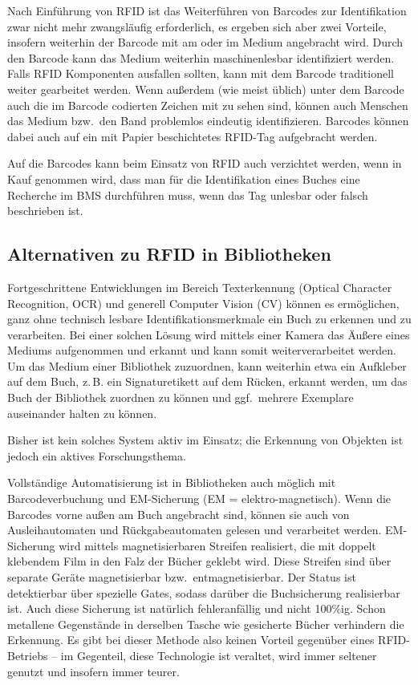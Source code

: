 \documentclass[
  11pt,
  letterpaper,
  DIV=11,
  twoside]{scrreprt}
\begin{document}
Nach Einführung von RFID ist das Weiterführen von Barcodes zur
Identifikation zwar nicht mehr zwangsläufig erforderlich, es ergeben
sich aber zwei Vorteile, insofern weiterhin der Barcode mit am oder im
Medium angebracht wird. Durch den Barcode kann das Medium weiterhin
maschinenlesbar identifiziert werden. Falls RFID Komponenten ausfallen
sollten, kann mit dem Barcode traditionell weiter gearbeitet werden.
Wenn außerdem (wie meist üblich) unter dem Barcode auch die im Barcode
codierten Zeichen mit zu sehen sind, können auch Menschen das Medium
bzw.~den Band problemlos eindeutig identifizieren. Barcodes können dabei
auch auf ein mit Papier beschichtetes RFID-Tag aufgebracht werden.

Auf die Barcodes kann beim Einsatz von RFID auch verzichtet werden, wenn
in Kauf genommen wird, dass man für die Identifikation eines Buches eine
Recherche im BMS durchführen muss, wenn das Tag unlesbar oder falsch
beschrieben ist.

\subsection{Alternativen zu RFID in
Bibliotheken}\label{alternativen-zu-rfid-in-bibliotheken}

Fortgeschrittene Entwicklungen im Bereich Texterkennung (Optical
Character Recognition, OCR) und generell Computer Vision (CV) können es
ermöglichen, ganz ohne technisch lesbare Identifikationsmerkmale ein
Buch zu erkennen und zu verarbeiten. Bei einer solchen Lösung wird
mittels einer Kamera das Äußere eines Mediums aufgenommen und erkannt
und kann somit weiterverarbeitet werden. Um das Medium einer Bibliothek
zuzuordnen, kann weiterhin etwa ein Aufkleber auf dem Buch, z.\,B. ein
Signaturetikett auf dem Rücken, erkannt werden, um das Buch der
Bibliothek zuordnen zu können und ggf.~mehrere Exemplare auseinander
halten zu können.

Bisher ist kein solches System aktiv im Einsatz; die Erkennung von
Objekten ist jedoch ein aktives Forschungsthema.

Vollständige Automatisierung ist in Bibliotheken auch möglich mit
Barcodeverbuchung und EM-Sicherung (EM = elektro-magnetisch). Wenn die
Barcodes vorne außen am Buch angebracht sind, können sie auch von
Ausleihautomaten und Rückgabeautomaten gelesen und verarbeitet werden.
EM-Sicherung wird mittels magnetisierbaren Streifen realisiert, die mit
doppelt klebendem Film in den Falz der Bücher geklebt wird. Diese
Streifen sind über separate Geräte magnetisierbar
bzw.~entmagnetisierbar. Der Status ist detektierbar über spezielle
Gates, sodass darüber die Buchsicherung realisierbar ist. Auch diese
Sicherung ist natürlich fehleranfällig und nicht 100\%ig. Schon
metallene Gegenstände in derselben Tasche wie gesicherte Bücher
verhindern die Erkennung. Es gibt bei dieser Methode also keinen Vorteil
gegenüber eines RFID-Betriebs -- im Gegenteil, diese Technologie ist
veraltet, wird immer seltener genutzt und insofern immer teurer.
\end{document}
